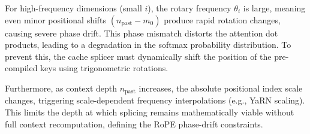 For high-frequency dimensions (small $i$), the rotary frequency $\theta_i$ is large, meaning even minor positional shifts $(n_{\text{past}} - m_0)$ produce rapid rotation changes, causing severe phase drift. This phase mismatch distorts the attention dot products, leading to a degradation in the softmax probability distribution. To prevent this, the cache splicer must dynamically shift the position of the pre-compiled keys using trigonometric rotations. 

Furthermore, as context depth $n_{\text{past}}$ increases, the absolute positional index scale changes, triggering scale-dependent frequency interpolations (e.g., YaRN scaling). This limits the depth at which splicing remains mathematically viable without full context recomputation, defining the RoPE phase-drift constraints.
